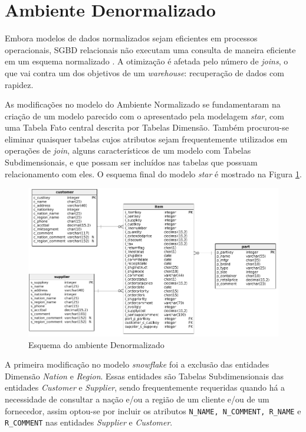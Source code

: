 \section{Ambiente Denormalizado}

Embora modelos de dados normalizados sejam eficientes em processos operacionais, SGBD relacionais não executam uma consulta de maneira eficiente em um esquema normalizado \cite{kimball2002dw}. A otimização é afetada pelo número de \textit{joins}, o que vai contra um dos objetivos de um \textit{warehouse}: recuperação de dados com rapidez. 

As modificações no modelo do Ambiente Normalizado se fundamentaram na criação de um modelo parecido com o apresentado pela modelagem \textit{star}, com uma Tabela Fato central descrita por Tabelas Dimensão. Também procurou-se eliminar quaisquer tabelas cujos atributos sejam frequentemente utilizados em operações de \textit{join}, alguns característicos de um modelo com Tabelas Subdimensionais, e que possam ser incluídos nas tabelas que possuam relacionamento com eles. O esquema final do modelo \textit{star} é mostrado na Figura \ref{fig:star}.

\begin{figure}[h]
	\centering
		\includegraphics[width=\textwidth]{img/star.png}
	\caption{Esquema do ambiente Denormalizado}
	\label{fig:star}
\end{figure}
 
A primeira modificação no modelo \textit{snowflake} foi a exclusão das entidades Dimensão \textit{Nation} e \textit{Region}. Essas entidades são Tabelas Subdimensionais das entidades \textit{Customer} e \textit{Supplier}, sendo frequentemente requeridas quando há a necessidade de consultar a nação e/ou a região de um cliente e/ou de um fornecedor, assim optou-se por incluir os atributos \texttt{N\_NAME, N\_COMMENT, R\_NAME} e \texttt{R\_COMMENT} nas entidades \textit{Supplier} e \textit{Customer}. 

